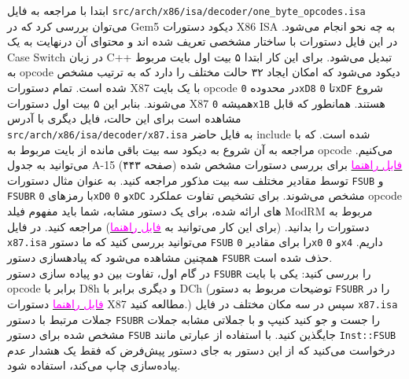 \documentclass[12pt]{exam}
\begin{document}
ابتدا با مراجعه به فایل \texttt{src/arch/x86/isa/decoder/one\_byte\_opcodes.isa} می‌توان بررسی کرد که در Gem5 دیکود دستورات X86 ISA به چه نحو انجام می‌شود. در این فایل دستورات با ساختار مشخصی تعریف شده اند و محتوای آن درنهایت به یک Case Switch در زبان C++ تبدیل می‌شود. برای این کار ابتدا ۵ بیت اول بایت مربوط به opcode دیکود می‌شود که امکان ایجاد ۳۲ حالت مختلف را دارد که به ترتیب مشخص شده است. تمام دستورات X87 با یک بایت opcode در محدوده \texttt{0xD8} تا \texttt{0xDF} شروع می‌شوند. بنابر این ۵ بیت اول دستورات X87 همیشه \texttt{0x1B} هستند. همانطور که قابل مشاهده است برای این حالت، فایل دیگری با آدرس \texttt{src/arch/x86/isa/decoder/x87.isa} به فایل حاضر include شده است. که با مراجعه به آن شروع به دیکود سه بیت باقی مانده از بایت مربوط به opcode می‌کنیم. می‌توانید به جدول A-15 (صفحه ۴۴۳) \href{https://socsvn.freebsd.org/socsvn/soc2014/op/docs/amd/24594_APM_v3.pdf}{\textcolor{magenta}{فایل راهنما}} برای بررسی دستورات مشخص شده توسط مقادیر مختلف سه بیت مذکور مراجعه کنید. به عنوان مثال دستورات \texttt{FSUB} و \texttt{FSUBR} با رمز‌های \texttt{0xD0} و \texttt{0xDC} مشخص می‌شوند. برای تشخیص تفاوت عملکرد opcode های ارائه شده، برای یک دستور مشابه، شما باید مفهوم فیلد ModRM مربوط به دستورات را بدانید. (برای این کار می‌توانید به \href{https://socsvn.freebsd.org/socsvn/soc2014/op/docs/amd/24594_APM_v3.pdf}{\textcolor{magenta}{فایل راهنما}}) مراجعه کنید. در فایل \texttt{x87.isa} می‌توانید بررسی کنید که ما دستور \texttt{FSUB} را برای مقادیر \texttt{0x0} و \texttt{0x4} داریم. همچنین مشاهده می‌شود که پیادهسازی دستور \texttt{FSUBR} حذف شده است. \\

در گام اول، تفاوت بین دو پیاده سازی دستور \texttt{FSUBR} را بررسی کنید:‌ یکی با بایت opcode برابر با D8h و دیگری برابر با DCh (توضیحات مربوط به دستور \texttt{FSUBR} را در \href{https://socsvn.freebsd.org/socsvn/soc2014/op/docs/amd/24594_APM_v3.pdf}{\textcolor{magenta}{فایل راهنما}} دستورات X87 مطالعه کنید.) سپس در سه مکان مختلف در فایل \texttt{x87.isa} جملات مرتبط با دستور \texttt{FSUBR} را جست و جو کنید کنیپ و با جملاتی مشابه جملات مشخص شده برای دستور \texttt{FSUB} جایگذین کنید. با استفاده از عبارتی مانند \texttt{Inst::FSUB} درخواست می‌کنید که از این دستور به جای دستور پیش‌فرض که فقط یک هشدار عدم پیاده‌سازی چاپ می‌کند،‌ استفاده شود. \\
\end{document}

